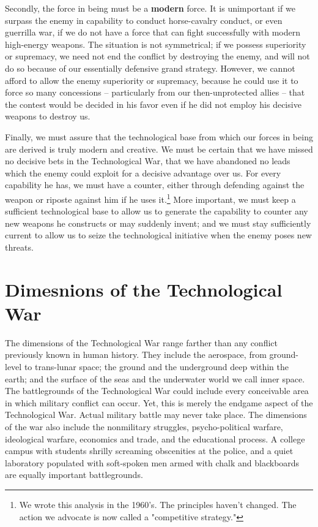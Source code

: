 Secondly, the force in being must be a \textbf{modern} force. It is unimportant if we surpass the enemy in capability to conduct horse-cavalry conduct, or even guerrilla war, if we do not have a force that can fight successfully with modern high-energy weapons. The situation is not symmetrical; if we possess superiority or supremacy, we need not end the conflict by destroying the enemy, and will not do so because of our essentially defensive grand strategy. However, we cannot afford to allow the enemy superiority or supremacy, because he could use it to force so many concessions -- particularly from our then-unprotected allies -- that the contest would be decided in his favor even if he did not employ his decisive weapons to destroy us.

Finally, we must assure that the technological base from which our forces in being are derived is truly modern and creative. We must be certain that we have missed no decisive bets in the Technological War, that we have abandoned no leads which the enemy could exploit for a decisive advantage over us. For every capability he has, we must have a counter, either through defending against the weapon or riposte against him if he uses it.\footnote{We wrote this analysis in the 1960's. The principles haven't changed. The action we advocate is now called a "competitive strategy."} More important, we must keep a sufficient technological base to allow us to generate the capability to counter any new weapons he constructs or may suddenly invent; and we must stay sufficiently current to allow us to seize the technological initiative when the enemy poses new threats.

\section{Dimesnions of the Technological War}
The dimensions of the Technological War range farther than any conflict previously known in human history. They include the aerospace, from ground-level to trans-lunar space; the ground and the underground deep within the earth; and the surface of the seas and the underwater world we call inner space. The battlegrounds of the Technological War could include every conceivable area in which military conflict can occur. Yet, this is merely the endgame aspect of the Technological War. Actual military battle may never take place. The dimensions of the war also include the nonmilitary struggles, psycho-political warfare, ideological warfare, economics and trade, and the educational process. A college campus with students shrilly screaming obscenities at the police, and a quiet laboratory populated with soft-spoken men armed with chalk and blackboards are equally important battlegrounds.

